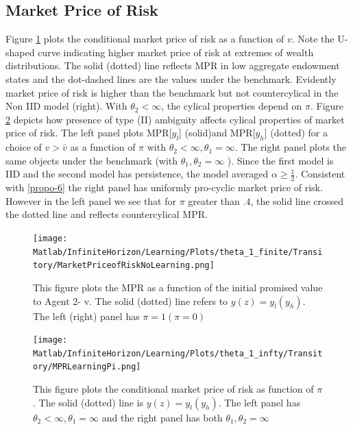 \documentclass[12pt]{article}
\begin{document}
\subsection{Market Price of Risk}
\label{sec-MPR}
Figure \ref{fig:MarketPriceOfRiskNoLearning} plots the conditional market price of risk as a function of $v$. Note the U-shaped curve indicating higher market price of risk at extremes of wealth distributions. The solid (dotted) line reflects MPR in low aggregate endowment states and the dot-dashed lines are the values under the benchmark. Evidently market price of risk is higher than the benchmark but not countercylical in the Non IID model (right). With $\theta_2 < \infty$, the cylical properties depend on $\pi$. Figure \ref{fig:MPRLearningPi} depicts how presence of type (II) ambiguity affects cylical properties of market price of risk. The left panel plots MPR[$y_l$] (solid)and MPR[$y_h$] (dotted) for a choice of $v > \bar{v}$ as a function of $\pi$ with $\theta_2<\infty,\theta_1=\infty$. The right panel plots the same objects under the benchmark (with $\theta_1,\theta_2=\infty$ ). Since the first model is IID and the second model has persistence, the model averaged $\alpha\geq\frac{1}{2}$. Consistent 
with \ref{propo-6} the right panel has uniformly pro-cyclic market price of risk. However in the left panel we see that for $\pi$ greater than $.4$, the solid line crossed the dotted line and reflects countercylical MPR.
\begin{figure}[htbp]
\centering
	  \texttt{[image: Matlab/InfiniteHorizon/Learning/Plots/theta\_1\_finite/Transitory/MarketPriceofRiskNoLearning.png]}

	\caption{\small {This figure plots the MPR as a function of the initial promised
value to Agent 2- v. The  solid (dotted) line refers to $y(z)=y_l (y_h)$. The
left (right) panel has $\pi=1 (\pi=0)$}}
	\label{fig:MarketPriceOfRiskNoLearning}
\end{figure} 

\begin{figure}[htbp]
\centering
	  \texttt{[image: Matlab/InfiniteHorizon/Learning/Plots/theta\_1\_infty/Transitory/MPRLearningPi.png]}

	\caption{ This figure plots the conditional market price of risk as function of $\pi$. The solid (dotted) line is $y(z)=y_l (y_h)$. The left panel has $\theta_2<\infty,\theta_1=\infty $ and the right panel has both $\theta_1,\theta_2=\infty$}
 
	\label{fig:MPRLearningPi}
\end{figure} 
\end{document}
